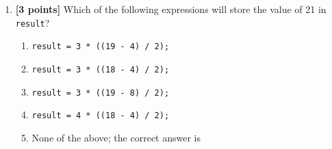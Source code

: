 \begin{enumerate}
\item {\bf [3 points]}
  Which of the following expressions will store the value of 21 in {\tt result}?
\begin{enumerate}
  \item {\tt result = 3 * ((19 - 4) / 2);}
\medskip 
  \item {\tt result = 3 * ((18 - 4) / 2);}
\medskip 
  \item {\tt result = 3 * ((19 - 8) / 2);}
\medskip
  \item {\tt result = 4 * ((18 - 4) / 2);}
\medskip
\item None of the above; the correct answer is \underline{\hspace{3in}}
\end{enumerate}

\bigskip
\bigskip

\end{enumerate}



